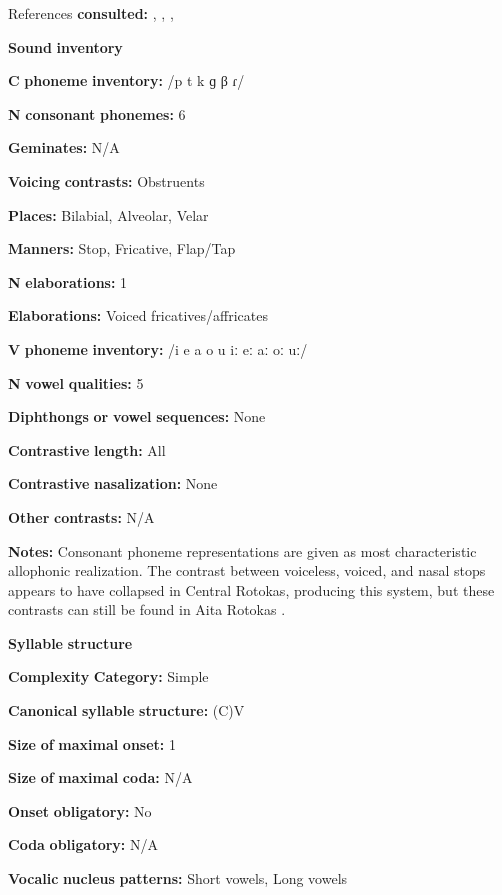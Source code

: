 \begin{styleBody}
References \textbf{consulted:} \citet{FirchowFirchow1969}, \citet{FirchowEtAl1973}, \citet{Robinson2006}, \citet{Robinson2011} 

\textbf{Sound} \textbf{inventory}

\textbf{C} \textbf{phoneme} \textbf{inventory:} /p t k ɡ β ɾ/

\textbf{N} \textbf{consonant} \textbf{phonemes:} 6

\textbf{Geminates:} N/A

\textbf{Voicing} \textbf{contrasts:} Obstruents

\textbf{Places:} Bilabial, Alveolar, Velar

\textbf{Manners:} Stop, Fricative, Flap/Tap

\textbf{N} \textbf{elaborations:} 1

\textbf{Elaborations:} Voiced fricatives/affricates

\textbf{V} \textbf{phoneme} \textbf{inventory:} /i e a o u iː eː aː oː uː/

\textbf{N} \textbf{vowel} \textbf{qualities:} 5

\textbf{Diphthongs} \textbf{or} \textbf{vowel} \textbf{sequences:} None

\textbf{Contrastive} \textbf{length:} All

\textbf{Contrastive} \textbf{nasalization:} None

\textbf{Other} \textbf{contrasts:} N/A

\textbf{Notes:} Consonant phoneme representations are given as most characteristic allophonic realization. The contrast between voiceless, voiced, and nasal stops appears to have collapsed in Central Rotokas, producing this system, but these contrasts can still be found in Aita Rotokas \citep{Robinson2006}.

\textbf{Syllable} \textbf{structure}

\textbf{Complexity} \textbf{Category:} Simple

\textbf{Canonical} \textbf{syllable} \textbf{structure:} (C)V \citep[28-9]{Robinson2011}

\textbf{Size} \textbf{of} \textbf{maximal} \textbf{onset:} 1

\textbf{Size} \textbf{of} \textbf{maximal} \textbf{coda:} N/A

\textbf{Onset} \textbf{obligatory:} No

\textbf{Coda} \textbf{obligatory:} N/A

\textbf{Vocalic} \textbf{nucleus} \textbf{patterns:} Short vowels, Long vowels


\end{styleBody}
